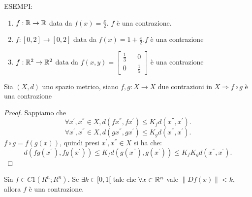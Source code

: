 ESEMPI:\\
\begin{enumerate}
	\item $f: \mathbb{R} \rightarrow \mathbb{R}$ data da $f(x) = \frac{x}{2}$. $f$ è una contrazione.
	\item $f: [0,2] \rightarrow [0,2]$ data da $f(x) = 1+\frac{x}{2}. f$ è una contrazione
	\item $f: \mathbb{R}^2 \rightarrow \mathbb{R}^2$ data da $f(x,y)=\begin{bmatrix} \frac{1}{3}&&0\\0&&\frac{1}{5}\end{bmatrix}$ è una contrazione
\end{enumerate}

\proposition
Sia $(X, d)$ uno spazio metrico, siano $f,g:X\rightarrow X$ due contrazioni in $X \Rightarrow f\circ g$ è una contrazione
\begin{proof}
	Sappiamo che\\
	$$\forall x^{'},x^{''}\in X, d(fx^{''}, fx^{'})\le K_fd(x^{''}, x^{'}).$$
	$$\forall x^{'},x^{''}\in X, d(gx^{''}, gx^{'})\le K_gd(x^{''}, x^{'}).$$
	$f\circ g=f(g(x))$, quindi presi $x^{'},x^{''}\in X$ si ha che: $$d(fg(x^{''}), fg(x^{'}))\le K_fd(g(x^{''}), g(x^{'}))\le K_fK_gd(x^{''},x^{'}).$$
\end{proof}

\proposition
Sia $f \in C1(R^n;R^n)$. Se $\exists k \in [0, 1[$ tale che $\forall x \in \mathbb{R}^n$ vale $\left\| Df(x)\right\|  < k$, allora $f$ è una contrazione.

